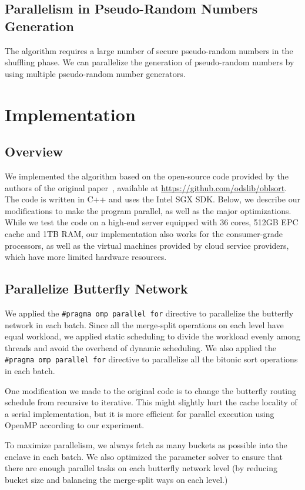 \documentclass{article}
\begin{document}
\subsection{Parallelism in Pseudo-Random Numbers Generation}
The algorithm requires a large number of secure pseudo-random numbers in the shuffling phase. We can parallelize the generation of pseudo-random numbers by using multiple pseudo-random number generators.

\section{Implementation}
\subsection{Overview}
We implemented the algorithm based on the open-source code provided by the authors of the original paper~\cite{osort}, available at \url{https://github.com/odslib/oblsort}. The code is written in C++ and uses the Intel SGX SDK. Below, we describe our modifications to make the program parallel, as well as the major optimizations. While we test the code on a high-end server equipped with 36 cores, 512GB EPC cache and 1TB RAM, our implementation also works for the consumer-grade processors, as well as the virtual machines provided by cloud service providers, which have more limited hardware resources.
\subsection{Parallelize Butterfly Network}
We applied the {\tt \#pragma omp parallel for} directive to parallelize the butterfly network in each batch. Since all the merge-split operations on each level have equal workload, we applied static scheduling to divide the workload evenly among threads and avoid the overhead of dynamic scheduling. We also applied the {\tt \#pragma omp parallel for} directive to parallelize all the bitonic sort operations in each batch.

One modification we made to the original code is to change the butterfly routing schedule from recursive to iterative. This might slightly hurt the cache locality of a serial implementation, but it is more efficient for parallel execution using OpenMP according to our experiment.

To maximize parallelism, we always fetch as many buckets as possible into the enclave in each batch. We also optimized the parameter solver to ensure that there are enough parallel tasks on each butterfly network level (by reducing bucket size and balancing the merge-split ways on each level.)
\end{document}

